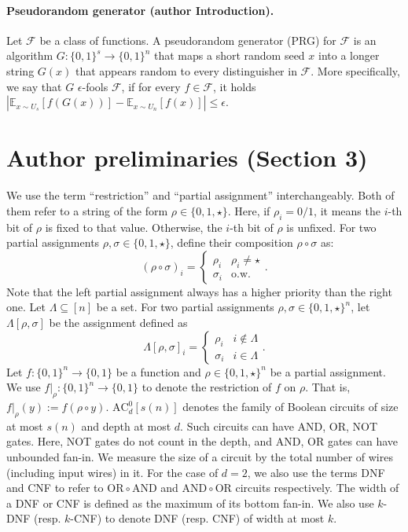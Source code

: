 \paragraph{Pseudorandom generator (author Introduction).} Let $\mathcal F$ be a class of functions. A pseudorandom generator (PRG) for $\mathcal F$ is an algorithm $G:\{0,1\}^s\to\{0,1\}^n$ that maps a short random seed $x$ into a longer string $G(x)$ that appears random to every distinguisher in $\mathcal F$. More specifically, we say that $G$ $\epsilon$-fools $\mathcal F$, if for every $f\in\mathcal F$, it holds $|\mathbb E_{x\sim U_s}[f(G(x))]-\mathbb E_{x\sim U_n}[f(x)]|\le\epsilon$.
\section*{Author preliminaries (Section 3)}
We use the term ``restriction'' and ``partial assignment'' interchangeably. Both of them refer to a string of the form $\rho\in\{0,1,\star\}$. Here, if $\rho_i=0/1$, it means the $i$-th bit of $\rho$ is fixed to that value. Otherwise, the $i$-th bit of $\rho$ is unfixed. For two partial assignments $\rho,\sigma\in\{0,1,\star\}$, define their composition $\rho\circ\sigma$ as:
\[(\rho\circ\sigma)_i=\begin{cases}\rho_i&\rho_i\ne\star\\\sigma_i&\text{o.w.}\end{cases}.\]
Note that the left partial assignment always has a higher priority than the right one. Let $\Lambda\subseteq[n]$ be a set. For two partial assignments $\rho,\sigma\in\{0,1,\star\}^n$, let $\Lambda[\rho,\sigma]$ be the assignment defined as
\[\Lambda[\rho,\sigma]_i=\begin{cases}\rho_i&i\notin\Lambda\\\sigma_i&i\in\Lambda\end{cases}.\]
Let $f:\{0,1\}^n\to\{0,1\}$ be a function and $\rho\in\{0,1,\star\}^n$ be a partial assignment. We use $f|_\rho:\{0,1\}^n\to\{0,1\}$ to denote the restriction of $f$ on $\rho$. That is, $f|_\rho(y):=f(\rho\circ y)$.
$\mathrm{AC}^0_d[s(n)]$ denotes the family of Boolean circuits of size at most $s(n)$ and depth at most $d$. Such circuits can have AND, OR, NOT gates. Here, NOT gates do not count in the depth, and AND, OR gates can have unbounded fan-in. We measure the size of a circuit by the total number of wires (including input wires) in it. For the case of $d=2$, we also use the terms DNF and CNF to refer to $\mathrm{OR}\circ\mathrm{AND}$ and $\mathrm{AND}\circ\mathrm{OR}$ circuits respectively. The width of a DNF or CNF is defined as the maximum of its bottom fan-in. We also use $k$-DNF (resp. $k$-CNF) to denote DNF (resp. CNF) of width at most $k$.
